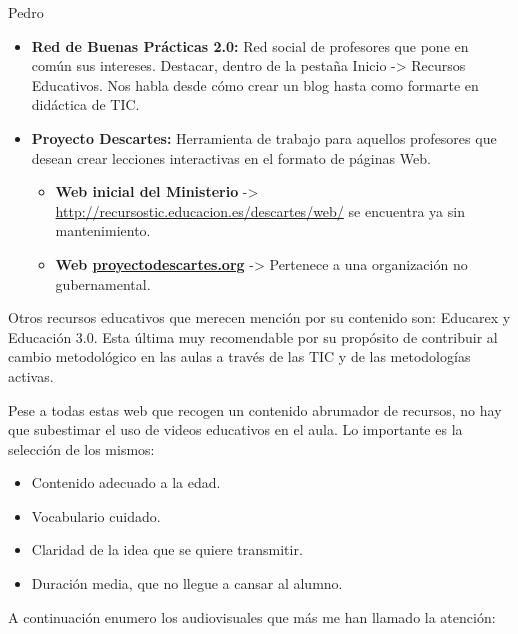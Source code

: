 \begin{opin}{\pedrocolor}{Pedro}
\begin{itemize}
\item \textbf{Red de Buenas Prácticas 2.0:} Red social de profesores que pone en común sus intereses. Destacar, dentro de la pestaña Inicio -> Recursos Educativos. Nos habla desde cómo crear un blog hasta como formarte en didáctica de TIC. 

\item \textbf{Proyecto Descartes:} Herramienta de trabajo para aquellos profesores que desean crear lecciones interactivas en el formato de páginas Web. 

\begin{itemize}

\item \textbf{Web inicial del Ministerio} -> \url{http://recursostic.educacion.es/descartes/web/} se encuentra ya sin mantenimiento. 

\item \textbf{Web \url{proyectodescartes.org}} -> Pertenece a una organización no gubernamental. 
\end{itemize}
\end{itemize}
 
Otros recursos educativos que merecen mención por su contenido son: Educarex y Educación 3.0. Esta última muy recomendable por su propósito de contribuir al cambio metodológico en las aulas a través de las TIC y de las metodologías activas.

Pese a todas estas web que recogen un contenido abrumador de recursos, no hay que subestimar el uso de videos educativos en el aula. Lo importante es la selección de los mismos:

\begin{itemize}

\item Contenido adecuado a la edad. 
\item Vocabulario cuidado. 
\item Claridad de la idea que se quiere transmitir. 
\item Duración media, que no llegue a cansar al alumno. 
 
\end{itemize} 
 
 
 
 
A continuación enumero los audiovisuales que más me han llamado la atención:
 

\begin{itemize} 


\end{itemize}
\end{opin}
